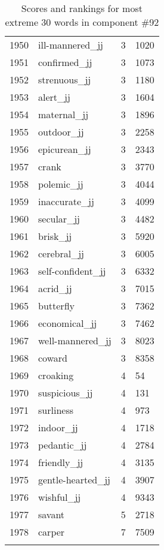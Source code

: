\begin{longtable}[!htbp]{| rlr@{.}l |}
    1950 & ill-mannered\_jj & 3 & 1020 \\
    1951 & confirmed\_jj & 3 & 1073 \\
    1952 & strenuous\_jj & 3 & 1180 \\
    1953 & alert\_jj & 3 & 1604 \\
    1954 & maternal\_jj & 3 & 1896 \\
    1955 & outdoor\_jj & 3 & 2258 \\
    1956 & epicurean\_jj & 3 & 2343 \\
    1957 & crank & 3 & 3770 \\
    1958 & polemic\_jj & 3 & 4044 \\
    1959 & inaccurate\_jj & 3 & 4099 \\
    1960 & secular\_jj & 3 & 4482 \\
    1961 & brisk\_jj & 3 & 5920 \\
    1962 & cerebral\_jj & 3 & 6005 \\
    1963 & self-confident\_jj & 3 & 6332 \\
    1964 & acrid\_jj & 3 & 7015 \\
    1965 & butterfly & 3 & 7362 \\
    1966 & economical\_jj & 3 & 7462 \\
    1967 & well-mannered\_jj & 3 & 8023 \\
    1968 & coward & 3 & 8358 \\
    1969 & croaking & 4 & 54 \\
    1970 & suspicious\_jj & 4 & 131 \\
    1971 & surliness & 4 & 973 \\
    1972 & indoor\_jj & 4 & 1718 \\
    1973 & pedantic\_jj & 4 & 2784 \\
    1974 & friendly\_jj & 4 & 3135 \\
    1975 & gentle-hearted\_jj & 4 & 3907 \\
    1976 & wishful\_jj & 4 & 9343 \\
    1977 & savant & 5 & 2718 \\
    1978 & carper & 7 & 7509 \\
    \hline
    \caption{Scores and rankings for most extreme 30 words in component \#92} \\
\end{longtable}
